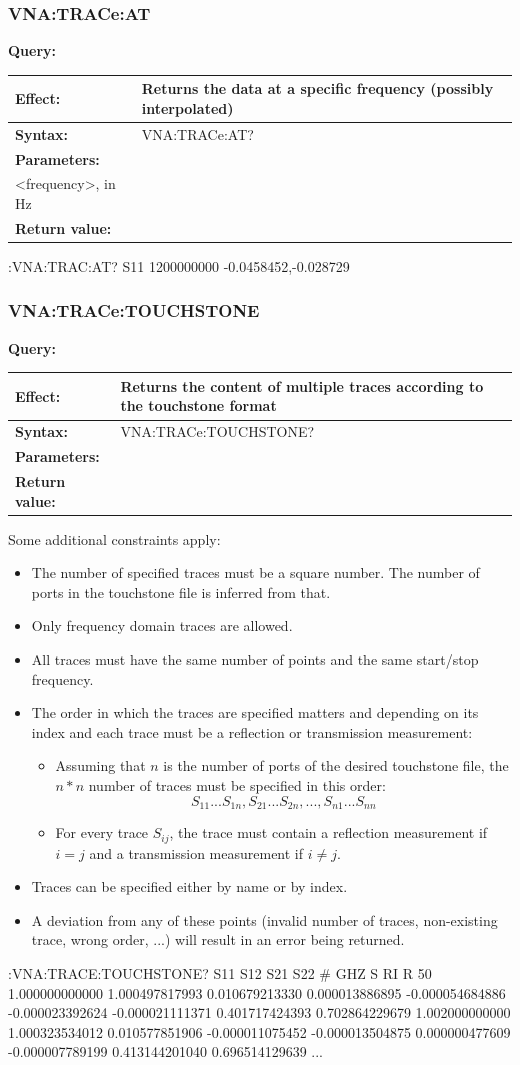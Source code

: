 \documentclass[a4paper,11pt]{article}
\newcommand{\query}[4]{
\noindent\textbf{Query:}
\begin{longtable}{p{.15\textwidth} | p{.80\textwidth} } 
\hline
\textbf{Effect:} & #1 \\ \hline
\textbf{Syntax:} & #2 \\ \hline 
\textbf{Parameters:} & \makecell[tl]{#3} \\ \hline
\textbf{Return value:} & \makecell[tl]{#4} \\ \hline
\end{longtable}
}
\begin{document}
\subsubsection{VNA:TRACe:AT}
\query{Returns the data at a specific frequency (possibly interpolated)}{VNA:TRACe:AT?}{<trace>, either by name or by index\\<frequency>, in Hz}{real,imag (or ``NaN,NaN'' if specified frequency is invalid)}
\begin{example}
:VNA:TRAC:AT? S11 1200000000
-0.0458452,-0.028729
\end{example}

\subsubsection{VNA:TRACe:TOUCHSTONE}
\query{Returns the content of multiple traces according to the touchstone format}{VNA:TRACe:TOUCHSTONE?}{<trace1>,<trace2>,<trace3>,...}{Touchstone file content in ASCII}
Some additional constraints apply:
\begin{itemize}
\item The number of specified traces must be a square number. The number of ports in the touchstone file is inferred from that.
\item Only frequency domain traces are allowed.
\item All traces must have the same number of points and the same start/stop frequency.
\item The order in which the traces are specified matters and depending on its index and each trace must be a reflection or transmission measurement:
\begin{itemize}
\item Assuming that $n$ is the number of ports of the desired touchstone file, the $n*n$ number of traces must be specified in this order:
$$ S_{11}...S_{1n},S_{21}...S_{2n},...,S_{n1}...S_{nn} $$
\item For every trace $S_{ij}$, the trace must contain a reflection measurement if $i=j$ and a transmission measurement if $i\neq j$.
\end{itemize}
\item Traces can be specified either by name or by index.
\item A deviation from any of these points (invalid number of traces, non-existing trace, wrong order, ...) will result in an error being returned.
\end{itemize}
\begin{example}
:VNA:TRACE:TOUCHSTONE? S11 S12 S21 S22
# GHZ S RI R 50
1.000000000000 1.000497817993 0.010679213330 0.000013886895 -0.000054684886 -0.000023392624 -0.000021111371 0.401717424393 0.702864229679
1.002000000000 1.000323534012 0.010577851906 -0.000011075452 -0.000013504875 0.000000477609 -0.000007789199 0.413144201040 0.696514129639
...
\end{example}
\end{document}
